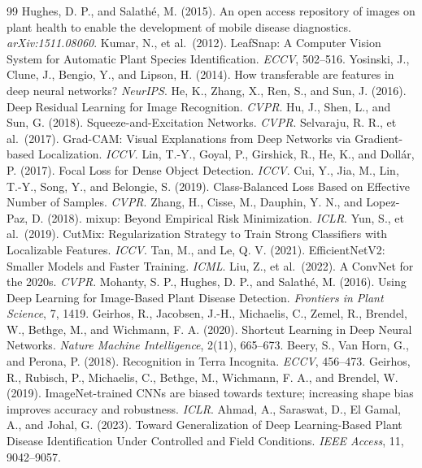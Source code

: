 \documentclass[12pt,a4paper]{article}
\begin{document}
\clearpage
\renewcommand{\refname}{REFERENCES}
\begin{thebibliography}{99}
 Hughes, D. P., and Salath\'e, M. (2015). An open access repository of images on plant health to enable the development of mobile disease diagnostics. \emph{arXiv:1511.08060}.
 Kumar, N., et al.\ (2012). LeafSnap: A Computer Vision System for Automatic Plant Species Identification. \emph{ECCV}, 502--516.
 Yosinski, J., Clune, J., Bengio, Y., and Lipson, H. (2014). How transferable are features in deep neural networks? \emph{NeurIPS}.
 He, K., Zhang, X., Ren, S., and Sun, J. (2016). Deep Residual Learning for Image Recognition. \emph{CVPR}.
 Hu, J., Shen, L., and Sun, G. (2018). Squeeze-and-Excitation Networks. \emph{CVPR}.
 Selvaraju, R. R., et al.\ (2017). Grad-CAM: Visual Explanations from Deep Networks via Gradient-based Localization. \emph{ICCV}.
 Lin, T.-Y., Goyal, P., Girshick, R., He, K., and Doll\'ar, P. (2017). Focal Loss for Dense Object Detection. \emph{ICCV}.
 Cui, Y., Jia, M., Lin, T.-Y., Song, Y., and Belongie, S. (2019). Class-Balanced Loss Based on Effective Number of Samples. \emph{CVPR}.
 Zhang, H., Cisse, M., Dauphin, Y. N., and Lopez-Paz, D. (2018). mixup: Beyond Empirical Risk Minimization. \emph{ICLR}.
 Yun, S., et al.\ (2019). CutMix: Regularization Strategy to Train Strong Classifiers with Localizable Features. \emph{ICCV}.
 Tan, M., and Le, Q. V. (2021). EfficientNetV2: Smaller Models and Faster Training. \emph{ICML}.
 Liu, Z., et al.\ (2022). A ConvNet for the 2020s. \emph{CVPR}.
 Mohanty, S. P., Hughes, D. P., and Salath\'e, M. (2016). Using Deep Learning for Image-Based Plant Disease Detection. \emph{Frontiers in Plant Science}, 7, 1419.
 Geirhos, R., Jacobsen, J.-H., Michaelis, C., Zemel, R., Brendel, W., Bethge, M., and Wichmann, F. A. (2020). Shortcut Learning in Deep Neural Networks. \emph{Nature Machine Intelligence}, 2(11), 665--673.
 Beery, S., Van Horn, G., and Perona, P. (2018). Recognition in Terra Incognita. \emph{ECCV}, 456--473.
 Geirhos, R., Rubisch, P., Michaelis, C., Bethge, M., Wichmann, F. A., and Brendel, W. (2019). ImageNet-trained CNNs are biased towards texture; increasing shape bias improves accuracy and robustness. \emph{ICLR}.
 Ahmad, A., Saraswat, D., El Gamal, A., and Johal, G. (2023). Toward Generalization of Deep Learning-Based Plant Disease Identification Under Controlled and Field Conditions. \emph{IEEE Access}, 11, 9042--9057.

\end{thebibliography}
\end{document}
